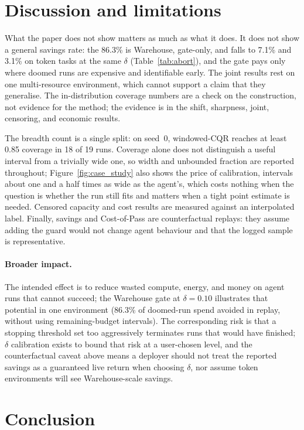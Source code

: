 \documentclass{article}
\begin{document}
\flushbottom
\section{Discussion and limitations}
\label{sec:discussion}

What the paper does not show matters as much as what it does. It does not show a general savings rate: the 86.3\% is Warehouse, gate-only, and falls to 7.1\% and 3.1\% on token tasks at the same $\delta$ (Table~\ref{tab:abort}), and the gate pays only where doomed runs are expensive and identifiable early. The joint results rest on one multi-resource environment, which cannot support a claim that they generalise. The in-distribution coverage numbers are a check on the construction, not evidence for the method; the evidence is in the shift, sharpness, joint, censoring, and economic results.

The breadth count is a single split: on seed~0, windowed-CQR reaches at least 0.85 coverage in 18 of 19 runs. Coverage alone does not distinguish a useful interval from a trivially wide one, so width and unbounded fraction are reported throughout; Figure~\ref{fig:case_study} also shows the price of calibration, intervals about one and a half times as wide as the agent's, which costs nothing when the question is whether the run still fits and matters when a tight point estimate is needed. Censored capacity and cost results are measured against an interpolated label. Finally, savings and Cost-of-Pass are counterfactual replays: they assume adding the guard would not change agent behaviour and that the logged sample is representative.

\paragraph{Broader impact.}
The intended effect is to reduce wasted compute, energy, and money on agent runs that cannot succeed; the Warehouse gate at $\delta{=}0.10$ illustrates that potential in one environment (86.3\% of doomed-run spend avoided in replay, without using remaining-budget intervals). The corresponding risk is that a stopping threshold set too aggressively terminates runs that would have finished; $\delta$ calibration exists to bound that risk at a user-chosen level, and the counterfactual caveat above means a deployer should not treat the reported savings as a guaranteed live return when choosing $\delta$, nor assume token environments will see Warehouse-scale savings.

\section{Conclusion}
\label{sec:conclusion}
\end{document}
